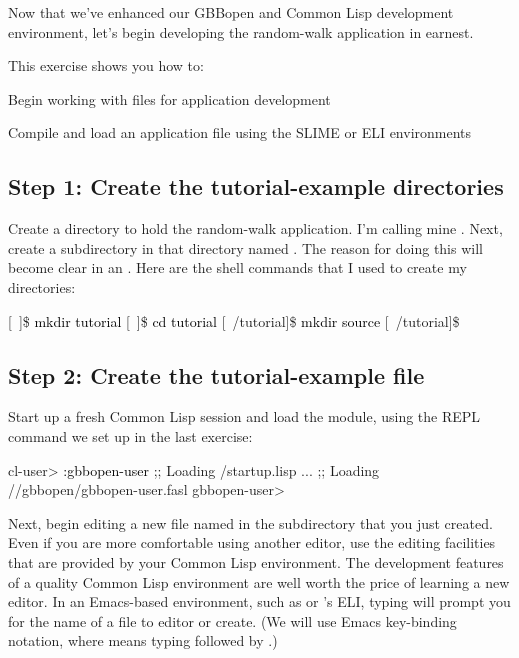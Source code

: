 \documentclass[10pt,twoside,english,pdftex]{article}
\begin{document}
Now that we've enhanced our GBBopen and Common Lisp development environment,
let's begin developing the random-walk application in earnest.

\fndocrule

This exercise shows you how to:
\begin{tightitemize}
\item Begin working with files for application development
\item Compile and load an application file using the SLIME or ELI
  environments
\end{tightitemize}

\fndocrule

\subsection*{Step 1: Create the tutorial-example directories}

Create a directory to hold the random-walk application.  I'm calling mine
.  Next, create a subdirectory in that directory named
.  The reason for doing this will become clear in an
. Here are the shell commands
that I used to create my directories:
%
\W\supp
\begin{example}
\textcolor{darkergray}{%
  [~]\$ \textcolor{black}{mkdir tutorial}
  [~]\$ \textcolor{black}{cd tutorial}
  [~/tutorial]\$ \textcolor{black}{mkdir source}
  [~/tutorial]\$}
\end{example}

\subsection*{Step 2: Create the tutorial-example file}

Start up a fresh Common Lisp session and load the 
module, using the REPL command we set up in the last exercise:
%
\W\supp
\begin{example}
\textcolor{darkergray}{%
  cl-user> \textcolor{black}{:gbbopen-user}
  ;; Loading /startup.lisp
     ...
  ;; Loading //gbbopen/gbbopen-user.fasl
  gbbopen-user>}
\end{example}

Next, begin editing a new file named  in the
 subdirectory that you just created.  Even if you are more
comfortable using another editor, use the editing facilities that are provided
by your Common Lisp environment.  The development features of a quality Common
Lisp environment are well worth the price of learning a new editor.  In an
Emacs-based environment, such as
 or 's ELI, typing  will prompt you for
the name of a file to editor or create.  (We will use Emacs key-binding
notation, where  means typing  followed by
{}.)
\end{document}
